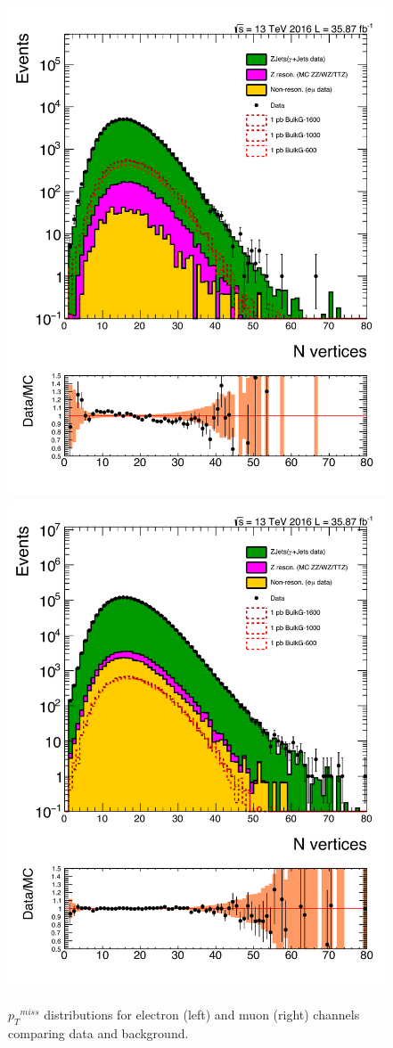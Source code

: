 \begin{figure}[htbp!]
\centering
\includegraphics[width=0.46\linewidth,page=16]{figures/ReMiniSummer16_DT_PhReMiniMCRcFixXsec_GMCPhPtWt_tightzpt50_puWeightsummer16_muoneg_gjet_metfilter_unblind_el_log_1pb.pdf}
\includegraphics[width=0.46\linewidth,page=16]{figures/ReMiniSummer16_DT_PhReMiniMCRcFixXsec_GMCPhPtWt_tightzpt50_puWeightsummer16_muoneg_gjet_metfilter_unblind_mu_log_1pb.pdf}
\caption{${p_{T}}^{miss}$ distributions for electron (left) and muon (right) channels
comparing data and background.}
\label{fig:gjet_met_wide}
\end{figure}

